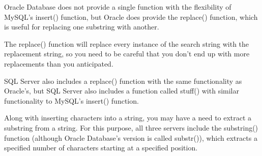 Oracle Database does not provide a single function with the flexibility of MySQL's insert() function, but Oracle does provide the replace() function, which is useful for replacing one substring with another.

The replace() function will replace every instance of the search string with the replacement string, so you need to be careful that you don't end up with more replacements than you anticipated.

SQL Server also includes a replace() function with the same functionality as Oracle's, but SQL Server also includes a function called stuff() with similar functionality to MySQL's insert() function.

Along with inserting characters into a string, you may have a need to extract a substring from a string. For this purpose, all three servers include the substring() function (although Oracle Database's version is called substr()), which extracts a specified number of characters starting at a specified position.
